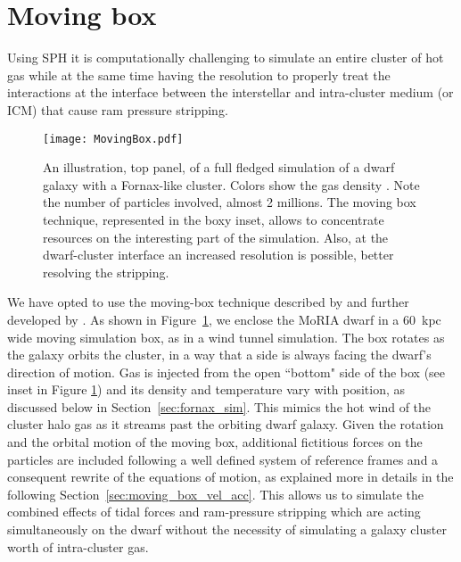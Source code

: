 \section{Moving box}
\label{sec:MovingBox}
Using SPH it is computationally challenging to simulate an entire cluster of hot gas while at the same time having the resolution to properly treat the interactions at the interface between the interstellar and intra-cluster medium (or ICM) that cause ram pressure stripping.

\begin{figure}[H]
 \centering
 \texttt{[image: MovingBox.pdf]}
 \caption{An illustration, top panel, of a full fledged simulation of a dwarf galaxy with a Fornax-like cluster.
 Colors show the gas density \citep[using the \texttt{glnemo2} software][]{Lambert2012}.
 Note the number of particles involved, almost 2 millions.
 The moving box technique, represented in the boxy inset, allows to concentrate resources on the interesting part of the simulation.
 Also, at the dwarf-cluster interface an increased resolution is possible, better resolving the stripping.}
 \label{fig:MovingBox}
\end{figure}

We have opted to use the moving-box technique described by \citet{Nichols2015} and further developed by \citet{Hausammann2019}.
As shown in Figure~\ref{fig:MovingBox}, we enclose the MoRIA dwarf in a $60$~kpc wide moving simulation box, as in a wind tunnel simulation.
The box rotates as the galaxy orbits the cluster, in a way that a side is always facing the dwarf's direction of motion.
Gas is injected from the open ``bottom" side of the box (see inset in Figure \ref{fig:MovingBox}) and its density and temperature vary with position, as discussed below in Section~\ref{sec:fornax_sim}.
This mimics the hot wind of the cluster halo gas as it streams past the orbiting dwarf galaxy.
Given the rotation and the orbital motion of the moving box, additional fictitious forces on the particles are included following a well defined system of reference frames and a consequent rewrite of the equations of motion, as explained more in details in the following Section~\ref{sec:moving_box_vel_acc}.
This allows us to simulate the combined effects of tidal forces and ram-pressure stripping \citep[as studied by][]{Mayer2006} which are acting simultaneously on the dwarf without the necessity of simulating a galaxy cluster worth of intra-cluster gas.

